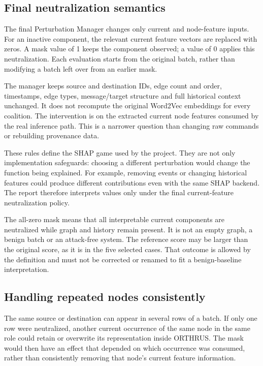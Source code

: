 \documentclass[11pt,a4paper]{article}
\newcommand{\code}[1]{\texttt{\detokenize{#1}}}
\begin{document}
\subsection{Final neutralization semantics}
The final Perturbation Manager changes only current \code{x_src} and
\code{x_dst} node-feature inputs. For an inactive component, the relevant
current feature vectors are replaced with zeros. A mask value of 1 keeps the
component observed; a value of 0 applies this neutralization. Each evaluation
starts from the original batch, rather than modifying a batch left over from
an earlier mask.

The manager keeps source and destination IDs, edge count and order, timestamps,
edge types, message/target structure and full historical context unchanged.
It does not recompute the original Word2Vec embeddings for every coalition.
The intervention is on the extracted current node features consumed by the
real inference path. This is a narrower question than changing raw commands
or rebuilding provenance data.

These rules define the SHAP game used by the project. They are not only
implementation safeguards: choosing a different perturbation would change the
function being explained. For example, removing events or changing historical
features could produce different contributions even with the same SHAP backend.
The report therefore interprets values only under the final current-feature
neutralization policy.

The all-zero mask means that all interpretable current components are
neutralized while graph and history remain present. It is not an empty graph,
a benign batch or an attack-free system. The reference score may be larger than
the original score, as it is in the five selected cases. That outcome is allowed
by the definition and must not be corrected or renamed to fit a benign-baseline
interpretation.

\subsection{Handling repeated nodes consistently}
The same source or destination can appear in several rows of a batch. If only
one row were neutralized, another current occurrence of the same node in the
same role could retain or overwrite its representation inside ORTHRUS. The
mask would then have an effect that depended on which occurrence was consumed,
rather than consistently removing that node's current feature information.
\end{document}
